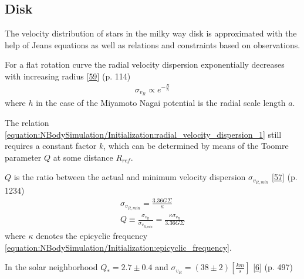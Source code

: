 \documentclass[letterpaper,10pt,english]{sphinxmanual}
\begin{document}
\subsection{Disk}
\label{\detokenize{NBodySimulation/Initialization:disk}}
\sphinxAtStartPar
The velocity distribution of stars in the milky way disk is approximated with the help of Jeans equations as well as relations and constraints based on observations.

\sphinxAtStartPar
For a flat rotation curve the radial velocity dispersion exponentially decreases with increasing radius {[}\hyperlink{cite.NBodySimulation/Appendix:id14}{59}{]} (p. 114)
\begin{equation}\label{equation:NBodySimulation/Initialization:radial_velocity_dispersion_1}
\begin{split}\sigma_{v_{R}} \propto e^{-\frac{R}{h}}\end{split}
\end{equation}
\sphinxAtStartPar
where \(h\) in the case of the Miyamoto Nagai potential is the radial scale length \(a\).

\sphinxAtStartPar
The relation \eqref{equation:NBodySimulation/Initialization:radial_velocity_dispersion_1} still requires a constant factor \(k\), which can be determined by means of the Toomre parameter \(Q\) at some distance \(R_{ref}\).

\sphinxAtStartPar
\(Q\) is the ratio between the actual and minimum velocity dispersion \(\sigma_{v_{R,min}}\) {[}\hyperlink{cite.NBodySimulation/Appendix:id16}{57}{]} (p. 1234)
\begin{equation*}
\begin{split}\sigma_{v_{R,min}} = \frac{3.36G\Sigma}{\kappa} \\
Q \equiv \frac{\sigma_{v_{R}}}{\sigma_{v_{R,min}}} = \frac{\kappa \sigma_{v_{R}}}{3.36G\Sigma }\end{split}
\end{equation*}
\sphinxAtStartPar
where \(\kappa\) denotes the epicyclic frequency \eqref{equation:NBodySimulation/Initialization:epicyclic_frequency}.

\sphinxAtStartPar
In the solar neighborhood \(Q_{\ast} = 2.7 \pm 0.4\) and \(\sigma_{v_{R}} = (38 \pm 2) \left [ \frac{km}{s} \right ]\) {[}\hyperlink{cite.NBodySimulation/Appendix:id17}{6}{]} (p. 497)
\end{document}
